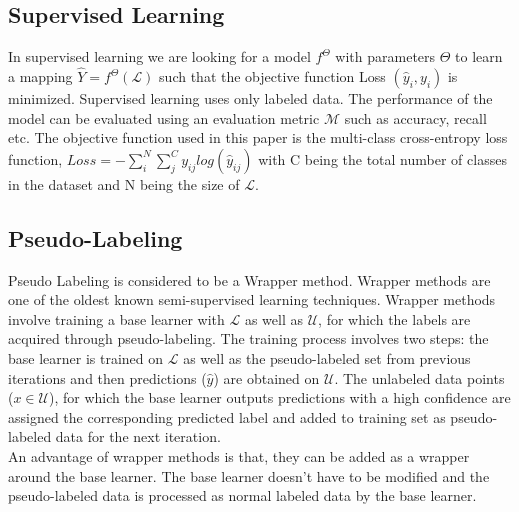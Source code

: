 \subsection{Supervised Learning}
In supervised learning we are looking for a model $f^\Theta$ with parameters $\Theta$ to learn a mapping $\hat{Y} = f^\Theta(\mathcal{L})$ such that the objective function Loss $(\hat{y}_i, y_i)$ is minimized. Supervised learning uses only labeled data. The performance of the model can be evaluated using an evaluation metric $\mathcal{M}$ such as accuracy, recall etc. The objective function used in this paper is the multi-class cross-entropy loss function, $Loss = - \sum_{i}^{N} \sum_{j}^{C} y_{ij}log(\hat{y}_{ij})$ with C being the total number of classes in the dataset and N being the size of $\mathcal{L}$.


\subsection{Pseudo-Labeling}
Pseudo Labeling is considered to be a Wrapper method. Wrapper methods are one of the oldest known semi-supervised learning techniques\cite{van2020}. Wrapper methods involve training a base learner with $\mathcal{L}$ as well as $\mathcal{U}$, for which the labels are acquired through pseudo-labeling\cite{mclachlan1975}. The training process involves two steps: the base learner is trained on $\mathcal{L}$ as well as the pseudo-labeled set from previous iterations and then predictions ($\hat{y}$) are obtained on $\mathcal{U}$. The unlabeled data points ($x \in \mathcal{U}$), for which the base learner outputs predictions with a high confidence are assigned the corresponding predicted label and added to training set as pseudo-labeled data for the next iteration. \\
An advantage of wrapper methods is that, they can be added as a wrapper around the base learner. The base learner doesn't have to be modified and the pseudo-labeled data is processed as normal labeled data by the base learner.

